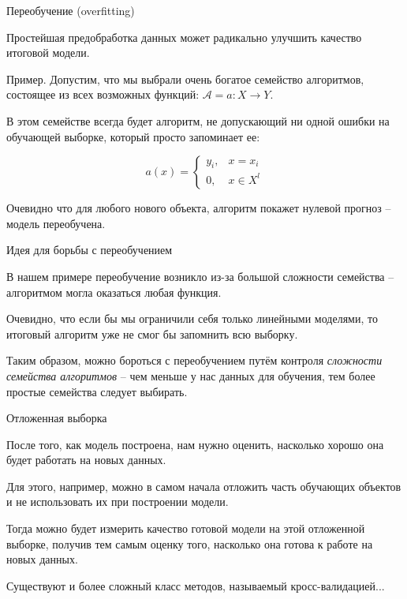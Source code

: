\documentclass[pdf, intlimits, 9pt, unicode]{beamer}
\begin{document}
\begin{frame}{Переобучение (overfitting)}

Простейшая предобработка данных может радикально улучшить качество итоговой модели.

Пример. Допустим, что мы выбрали очень богатое семейство алгоритмов, состоящее из всех возможных функций: $\mathcal{A} = {a : X \rightarrow Y}$.\pause

В этом семействе всегда будет алгоритм, не допускающий ни одной
ошибки на обучающей выборке, который просто запоминает ее:\pause

$$a(x) = \left \{  \begin{matrix} y_i, & x = x_i\\  0, & x \in X^l\end{matrix}\right .$$

Очевидно что для любого нового объекта, алгоритм покажет нулевой прогноз -- модель переобучена.
\end{frame}






\begin{frame}{Идея для борьбы с переобучением}

В нашем примере переобучение возникло из-за большой сложности семейства -- алгоритмом могла оказаться любая функция. \pause

Очевидно, что если бы мы ограничили себя только линейными моделями, то итоговый алгоритм уже не смог
бы запомнить всю выборку.\pause

Таким образом, можно бороться с переобучением путём контроля \emph{сложности семейства алгоритмов} -- чем меньше у нас данных для обучения, тем более простые семейства следует выбирать.
\end{frame}






\begin{frame}{Отложенная выборка}

После того, как модель построена, нам нужно оценить, насколько хорошо она будет работать на новых данных.\pause

Для этого, например, можно в самом начала отложить часть обучающих объектов и не использовать их при построении модели.\pause

Тогда можно будет измерить качество готовой модели на этой отложенной выборке, получив тем самым оценку того, насколько она готова к работе на новых данных.\pause

Существуют и более сложный класс методов, называемый кросс-валидацией...
\end{frame}
\end{document}
